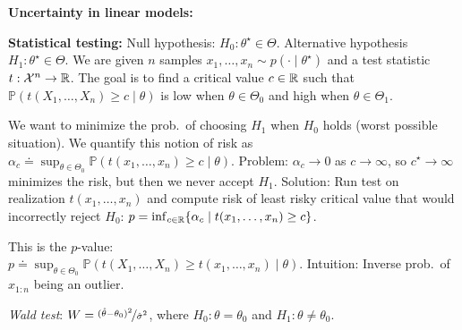 \documentclass[9pt]{extarticle}
\newenvironment{topic}[1]
{\textbf{\sffamily \colorbox{black}{\rlap{\textbf{\textcolor{white}{#1}}}\hspace{\linewidth}\hspace{-2\fboxsep}}}}
{}
\newenvironment{subtopic}[1]
{\textbf{\sffamily #1:}}
{}
\begin{document}
\begin{multicols*}{3}
\begin{topic}{Uncertainty quantification}
\begin{subtopic}{Uncertainty in linear models}
        \end{subtopic}

        \begin{subtopic}{Statistical testing}
            Null hypothesis: $H_0: \theta^\star \in \Theta$. Alternative hypothesis $H_1: \theta^\star \in
                \Theta$. We are given $n$ samples $x_1, \ldots, x_n \sim p(\cdot \mid \theta^\star)$ and a test
            statistic $t: \mathcal{X}^n \to \mathbb{R}$. The goal is to find a critical value $c \in \mathbb{R}$ such that
            $\mathbb{P}(t(X_1,\ldots,X_n) \geq c \mid \theta)$ is low when $\theta \in \Theta_0$ and high when
            $\theta \in \Theta_1$.

            We want to minimize the prob.\ of choosing $H_1$ when $H_0$ holds (worst possible situation). We
            quantify this notion of risk as $\alpha_c \doteq \sup_{\theta \in \Theta_0} \mathbb{P}(t(x_1,
                \ldots, x_n) \geq c \mid \theta)$. Problem: $\alpha_c \to 0$ as $c \to \infty$, so $c^\star \to
                \infty$ minimizes the risk, but then we never accept $H_1$. Solution: Run test on realization
            $t(x_1, \ldots, x_n)$ and compute risk of least risky critical value that would incorrectly reject
            $H_0$: $p = \inf_{c \in \mathbb{R}} \{ \alpha_c \mid t(x_1, \ldots, x_n) \geq c \}$.

            This is the $p$-value: \\ $p \doteq \sup_{\theta \in \Theta_0} \mathbb{P}(t(X_1, \ldots, X_n) \geq
                t(x_1, \ldots, x_n) \mid \theta)$. Intuition: Inverse prob.\ of $x_{1:n}$ being an outlier.

            \textit{Wald test}: $W = \nicefrac{(\hat{\theta} - \theta_0)^2}{\hat{\sigma}^2}$, where
            $H_0: \theta = \theta_0$ and $H_1: \theta \neq \theta_0$.
        \end{subtopic}


\end{topic}
\end{multicols*}
\end{document}
